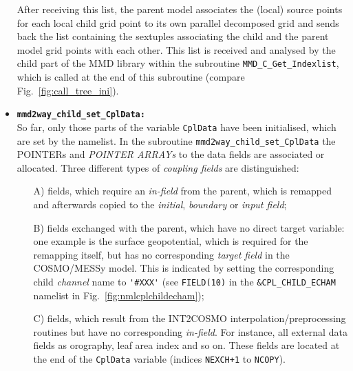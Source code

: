 \documentclass[11pt,twoside]{article}
\begin{document}
\begin{itemize}
After receiving this list, the parent model associates the (local)
source points for  
each local child grid point to its own parallel decomposed grid
and sends back the list containing the sextuples
associating the child and the parent model grid points with each other. 
This list is received and analysed by the child part of the MMD library within 
the subroutine \verb|MMD_C_Get_Indexlist|, which is called at the end of this 
subroutine (compare Fig.\ \ref{fig:call_tree_ini}).

\item {\tt \bf mmd2way\_child\_set\_CplData:\\}\label{srt:get_CPLDATA}
So far, only those parts of the variable \verb|CplData| have been initialised,
which are set by the namelist. In the
subroutine \verb|mmd2way_child_set_CplData| 
the {\footnotesize POINTERs}  and { \footnotesize \it POINTER ARRAYs}
to the data fields are associated or allocated.
Three different types of {\it coupling fields} are distinguished:
\begin{itemize}%
\item[A)] fields, which require an {\it in-field} from the parent, which 
is remapped and afterwards copied to the {\it initial}, {\it boundary}
 or {\it input field};
\item[B)] fields exchanged with the parent, which have no direct
 target variable: 
one example is the surface geopotential, which is required for the
remapping  
itself, but has no corresponding {\it target field} in the COSMO/MESSy model. 
This is indicated by setting
the corresponding child {\it channel} name to \verb|'#XXX'| (see 
\verb|FIELD(10)| in the \verb|&CPL_CHILD_ECHAM| namelist in
Fig.\ \ref{fig:nmlcplchildecham}); 
\item[C)] fields, which result from the INT2COSMO interpolation/preprocessing
 routines but have no corresponding {\it in-field}. For instance, all external 
data fields as orography, leaf area index and so on.
These fields are located at the end of the \verb|CplData| variable (indices 
\verb|NEXCH+1| to \verb|NCOPY|).
\end{itemize}%


\end{itemize}
\end{document}
